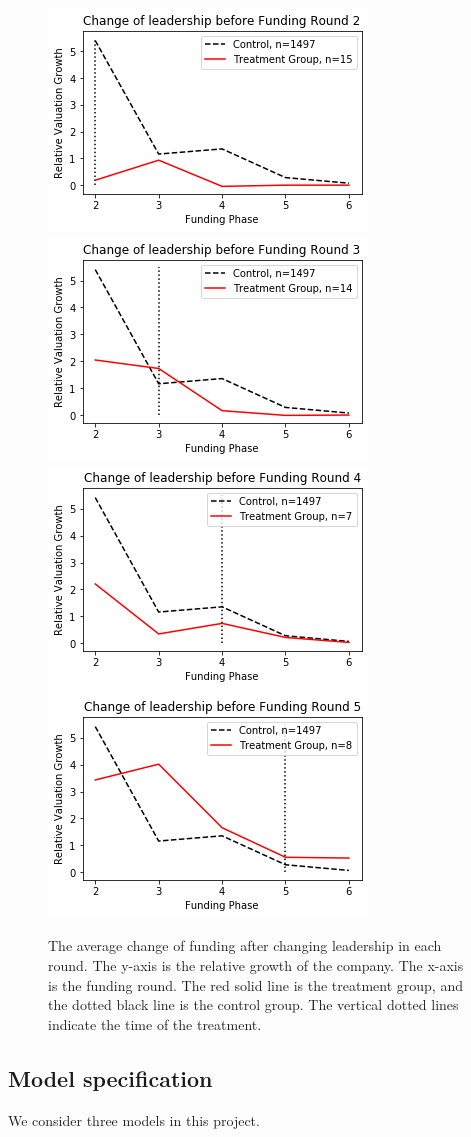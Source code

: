 \documentclass[12pt]{article}
\begin{document}
\begin{figure}
    \centering
    \includegraphics[width=.45\textwidth]{figures/r2.png}
    \includegraphics[width=.45\textwidth]{figures/r3.png}
    \includegraphics[width=.45\textwidth]{figures/r4.png}
    \includegraphics[width=.45\textwidth]{figures/r5.png}
    \caption{The average change of funding after changing leadership in each round. The y-axis is the relative growth of the company. The x-axis is the funding round. The red solid line is the treatment group, and the dotted black line is the control group. The vertical dotted lines indicate the time of the treatment. }
    \label{fig:analytics}
\end{figure}

\subsection{Model specification}
We consider three models in this project.
\end{document}
